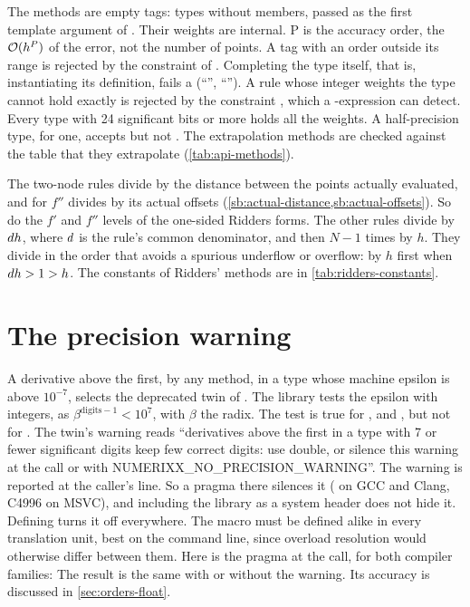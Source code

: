 The methods are empty tags: types without members, passed as the first template argument of .
Their weights are internal. P is the accuracy order, the $\mathcal{O}(h^P)$ of the error, not the number of points. A tag
with an order outside its range is rejected by the constraint of . Completing the type itself, that
is, instantiating its definition, fails a 
(``'', ``''). A
rule whose integer weights the type  cannot hold exactly is rejected by the constraint
, which a -expression can detect. Every type with 24 significant
bits or more holds all the weights. A half-precision type, for one, accepts  but not
. The extrapolation methods are checked against the table that they extrapolate
(\cref{tab:api-methods}).

The two-node rules divide by the distance between the points actually evaluated, and  for $f''$
divides by its actual offsets (\cref{sb:actual-distance,sb:actual-offsets}). So do the $f'$ and $f''$ levels of the
one-sided Ridders forms. The other rules divide by $d h$, where $d$ is the rule's common denominator, and then
$N - 1$ times by $h$. They divide in the order that avoids a spurious underflow or overflow: by $h$ first when
$d h > 1 > h$. The constants of Ridders' methods are in \cref{tab:ridders-constants}.

\section{The precision warning}\label{sec:api-warning}

A derivative above the first, by any method, in a type whose machine epsilon is above $10^{-7}$, selects the
deprecated twin of . The library tests the epsilon with integers, as $\beta^{\text{digits} - 1} <
10^7$, with $\beta$ the radix. The test is true for ,  and , but not for
. The twin's warning reads ``derivatives above the first in a type with 7 or fewer significant digits
keep few correct digits: use double, or silence this warning at the call or with
NUMERIXX\_NO\_PRECISION\_WARNING''. The warning is reported at the caller's line. So a pragma there silences it
( on GCC and Clang, C4996 on MSVC), and including the library as a system header
does not hide it. Defining  turns it off everywhere. The macro must be defined
alike in every translation unit, best on the command line, since overload resolution would otherwise differ
between them. Here is the pragma at the call, for both compiler families:
The result is the same with or without the warning. Its accuracy is discussed in \cref{sec:orders-float}.

